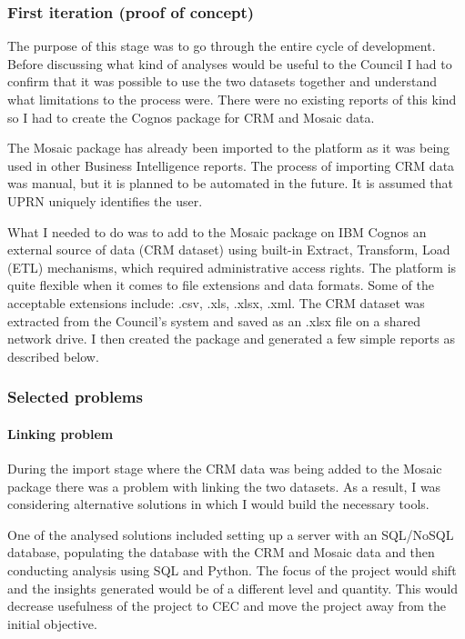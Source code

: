 			\subsubsection{First iteration (proof of concept)}
			
The purpose of this stage was to go through the entire cycle of development. Before discussing what kind of analyses would be useful to the Council I had to confirm that it was possible to use the two datasets together and understand what limitations to the process were. There were no existing reports of this kind so I had to create the Cognos package for CRM and Mosaic data.

The Mosaic package has already been imported to the platform as it was being used in other Business Intelligence reports. The process of importing CRM data was manual, but it is planned to be automated in the future. It is assumed that UPRN uniquely identifies the user.

What I needed to do was to add to the Mosaic package on IBM Cognos an external source of data (CRM dataset) using built-in Extract, Transform, Load (ETL) mechanisms, which required administrative access rights. The platform is quite flexible when it comes to file extensions and data formats. Some of the acceptable extensions include: .csv, .xls, .xlsx, .xml. The CRM dataset was extracted from the Council’s system and saved as an .xlsx file on a shared network drive. I then created the package and generated a few simple reports as described below.

			
			\subsubsection{Selected problems}
			
				\paragraph{Linking problem}
				
During the import stage where the CRM data was being added to the Mosaic package there was a problem with linking the two datasets. As a result, I was considering alternative solutions in which I would build the necessary tools.

One of the analysed solutions included setting up a server with an SQL/NoSQL database, populating the database with the CRM and Mosaic data and then conducting analysis using SQL and Python. The focus of the project would shift and the insights generated would be of a different level and quantity. This would decrease usefulness of the project to CEC and move the project away from the initial objective.

